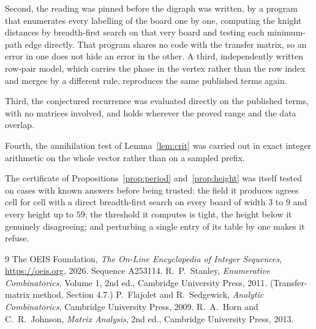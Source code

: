 \documentclass[11pt,a4paper]{article}
\theoremstyle{plain}
\theoremstyle{definition}
\begin{document}
Second, the reading was pinned before the digraph was written, by a program that enumerates
every labelling of the board one by one, computing the knight distances by breadth-first
search on that very board and testing each minimum-path edge directly. That program shares no
code with the transfer matrix, so an error in one does not hide an error in the other. A
third, independently written row-pair model, which carries the phase in the vertex rather than
the row index and merges by a different rule, reproduces the same published terms again.

Third, the conjectured recurrence was evaluated directly on the published terms, with no
matrices involved, and holds wherever the proved range and the data overlap.

Fourth, the annihilation test of Lemma~\ref{lem:crit} was carried out in exact integer
arithmetic on the whole vector rather than on a sampled prefix.

The certificate of Propositions~\ref{prop:period} and~\ref{prop:height} was itself tested
on cases with known answers before being trusted: the field it produces agrees cell for cell
with a direct breadth-first search on every board of width $3$ to $9$ and every height up to
$59$; the threshold it computes is tight, the height below it genuinely disagreeing; and
perturbing a single entry of its table by one makes it refuse.

\begin{thebibliography}{9}
 The OEIS Foundation, \emph{The On-Line Encyclopedia of Integer
Sequences}, \url{https://oeis.org}, 2026. Sequence A253114.
 R.~P.~Stanley, \emph{Enumerative Combinatorics}, Volume 1, 2nd ed.,
Cambridge University Press, 2011. (Transfer-matrix method, Section 4.7.)
 P.~Flajolet and R.~Sedgewick, \emph{Analytic Combinatorics}, Cambridge
University Press, 2009.
 R.~A.~Horn and C.~R.~Johnson, \emph{Matrix Analysis}, 2nd ed., Cambridge
University Press, 2013.
\end{thebibliography}
\end{document}
